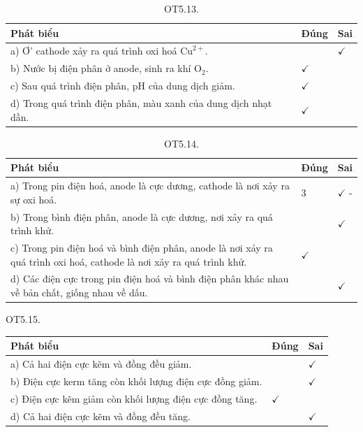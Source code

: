 \documentclass[10pt]{article}
\begin{document}
\begin{table}[h]
\begin{center}
\captionsetup{labelformat=empty}
\caption{OT5.13.}
\begin{tabular}{|l|l|l|}
\hline
Phát biểu & Đúng & Sai \\
\hline
a) Ơ' cathode xảy ra quá trình oxi hoá $\mathrm{Cu}^{2+}$. &  & $\checkmark$ \\
\hline
b) Nước bị điện phân ở anode, sinh ra khí $\mathrm{O}_{2}$. & $\checkmark$ &  \\
\hline
c) Sau quá trình điện phân, pH của dung dịch giảm. & $\checkmark$ &  \\
\hline
d) Trong quá trình điện phân, màu xanh của dung dịch nhạt dần. & $\checkmark$ &  \\
\hline
\end{tabular}
\end{center}
\end{table}

\begin{table}[h]
\begin{center}
\captionsetup{labelformat=empty}
\caption{OT5.14.}
\begin{tabular}{|l|l|l|}
\hline
Phát biểu & Đúng & Sai \\
\hline
a) Trong pin điện hoá, anode là cực dương, cathode là nơi xảy ra sự oxi hoá. & 3 & $\checkmark$ - \\
\hline
b) Trong bình điện phân, anode là cực dương, nơi xảy ra quá trình khử. &  & $\checkmark$ \\
\hline
c) Trong pin điện hoá và bình điện phân, anode là nơi xảy ra quá trình oxi hoá, cathode là nơi xảy ra quá trình khử. & $\checkmark$ &  \\
\hline
d) Các điện cực trong pin điện hoá và bình điện phân khác nhau về bản chất, giống nhau về dấu. &  & $\checkmark$ \\
\hline
\end{tabular}
\end{center}
\end{table}

OT5.15.

\begin{center}
\begin{tabular}{|l|l|l|}
\hline
Phát biểu & Đúng & Sai \\
\hline
a) Cả hai điện cực kẽm và đồng đều giảm. &  & $\checkmark$ \\
\hline
b) Điện cực kerm tăng còn khối lượng điện cực đồng giảm. &  & $\checkmark$ \\
\hline
c) Điện cực kẽm giảm còn khối lượng điện cực đồng tăng. & $\checkmark$ &  \\
\hline
d) Cả hai điện cực kẽm và đồng đều tăng. &  & $\checkmark$ \\
\hline
\end{tabular}
\end{center}
\end{document}
